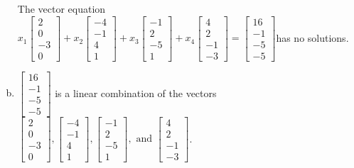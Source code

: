 \begin{exerciseAnswer}
\begin{enumerate}[(a)]
\begin{center}
\begin{minipage}{0.8\textwidth}
 The vector equation \( x_{1} \left[\begin{array}{c}
2 \\
0 \\
-3 \\
0
\end{array}\right] + x_{2} \left[\begin{array}{c}
-4 \\
-1 \\
4 \\
1
\end{array}\right] + x_{3} \left[\begin{array}{c}
-1 \\
2 \\
-5 \\
1
\end{array}\right] + x_{4} \left[\begin{array}{c}
4 \\
2 \\
-1 \\
-3
\end{array}\right] = \left[\begin{array}{c}
16 \\
-1 \\
-5 \\
-5
\end{array}\right] \)has no solutions.
\end{minipage}\end{center}
    
\item 

\( \left[\begin{array}{c}
16 \\
-1 \\
-5 \\
-5
\end{array}\right] \) is a linear combination of the vectors \( \left[\begin{array}{c}
2 \\
0 \\
-3 \\
0
\end{array}\right] , \left[\begin{array}{c}
-4 \\
-1 \\
4 \\
1
\end{array}\right] , \left[\begin{array}{c}
-1 \\
2 \\
-5 \\
1
\end{array}\right] , \text{ and } \left[\begin{array}{c}
4 \\
2 \\
-1 \\
-3
\end{array}\right] \). 


\end{enumerate}
    
\end{exerciseAnswer}
    
